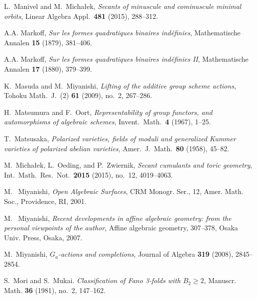 L.~Manivel and M.~Micha{\l}ek,
\emph{Secants of minuscule and cominuscule minimal orbits},
Linear Algebra Appl.\ \textbf{481} (2015), 288--312.


A.A. Markoff, \emph{Sur les formes quadratiques binaires ind\'efinies}, Mathematische
Annalen \textbf{15} (1879), 381--406.

A.A. Markoff, \emph{Sur les formes quadratiques binaires ind\'efinies II}, Mathematische
Annalen \textbf{17} (1880), 379--399.

K.~Masuda and M.~Miyanishi,
\emph{Lifting of the additive group scheme actions},
Tohoku Math.\ J.\ (2) \textbf{61} (2009), no.~2, 267--286.

H.~Matsumura and F.~Oort,
\emph{Representability of group functors,
and automorphisms of algebraic schemes},
Invent.\ Math.\ \textbf{4} (1967), 1--25.

T.~Matsusaka,
\emph{Polarized varieties, fields of moduli and generalized Kummer
varieties of polarized abelian varieties},
Amer.\ J.\ Math.\ \textbf{80} (1958), 45--82.

M.~Micha{\l}ek, L.~Oeding, and P.~Zwiernik,
\emph{Secant cumulants and toric geometry},
Int.\ Math.\ Res.\ Not.\ \textbf{2015} (2015), no.~12, 4019--4063.

M.~ Miyanishi, \emph{Open Algebraic Surfaces},
CRM Monogr. Ser., 12, Amer. Math. Soc., Providence, RI, 2001.

M.~ Miyanishi, \emph{Recent developments in affine algebraic geometry:
from the personal viewpoints of the author}, Affine algebraic geometry, 307--378,
Osaka Univ. Press, Osaka, 2007.

M.~Miyanishi, \emph{$G_a$-actions and completions},
Journal of Algebra \textbf{319} (2008), 2845--2854.



S.~Mori and S.~Mukai.
\emph{Classification of Fano 3-folds with $B_2 \geq 2$}, Manuscr. Math. \textbf{36} (1981), no.~2, 147--162.

